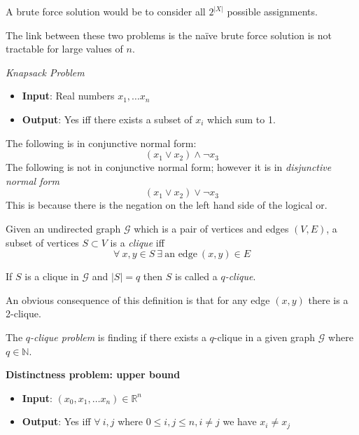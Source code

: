 A brute force solution would be to consider all $2^{|X|}$ possible assignments.

The link between these two problems is the na\"ive brute force solution is not
tractable for large values of $n$.

\textit{Knapsack Problem}\\
\begin{itemize}
    \item \textbf{Input}: Real numbers $x_1,\dots x_n$
    \item \textbf{Output}: Yes iff there exists a subset of $x_i$ which sum to 1.
\end{itemize}

The following is in conjunctive normal form:
$$(x_1 \lor x_2) \land \neg x_3$$
The following is not in conjunctive normal form;
however it is in \textit{disjunctive normal form}
$$(x_1 \lor x_2) \lor \neg x_3$$
This is because there is the negation on the left hand side of the logical or.

\begin{definition}
    Given an undirected graph $\mathcal{G}$ which is a pair of vertices and edges $(V,E)$,
    a subset of vertices $S \subset V$ is a \textit{clique} iff
    $$\forall\ x, y \in S\ \exists\ \textrm{an edge}\ (x,y) \in E$$
\end{definition}

\begin{definition}
    If $S$ is a clique in $\mathcal{G}$ and $|S| = q$ then $S$ is called a \textit{$q$-clique}.
\end{definition}

An obvious consequence of this definition is that for any edge $(x,y)$ there is a 2-clique.

\begin{definition}
    The \textit{$q$-clique problem} is finding if there exists a $q$-clique in a given graph
    $\mathcal{G}$ where $q \in \mathbb{N}$.
\end{definition}

\textbf{Distinctness problem: upper bound}\\
\begin{itemize}
    \item \textbf{Input}: $(x_0, x_1,\dots x_n) \in \mathbb{R}^n$
    \item \textbf{Output}: Yes iff $\forall\ i,j$ where $0 \leq i,j \leq n, i \neq j$ we have $x_i \neq x_j$
\end{itemize}
